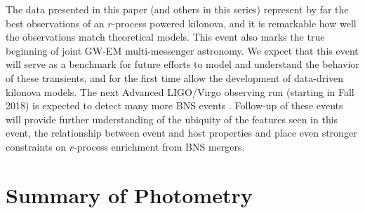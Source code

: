 The data presented in this paper (and others in this series) represent by far the best observations of an $r$-process powered kilonova, and it is remarkable how well the observations match theoretical models.  This event also marks the true beginning of joint GW-EM multi-messenger astronomy.  We expect that this event will serve as a benchmark for future efforts to model and understand the behavior of these transients, and for the first time allow the development of data-driven kilonova models. The next Advanced LIGO/Virgo observing run (starting in Fall 2018) is expected to detect many more BNS events \citep{LIGOLocalization}. Follow-up of these events will provide further understanding of the ubiquity of the features seen in this event, the relationship between event and host properties and place even stronger constraints on $r$-process enrichment from BNS mergers.

\section{Summary of Photometry}
\label{sec:ch5_photometry}

